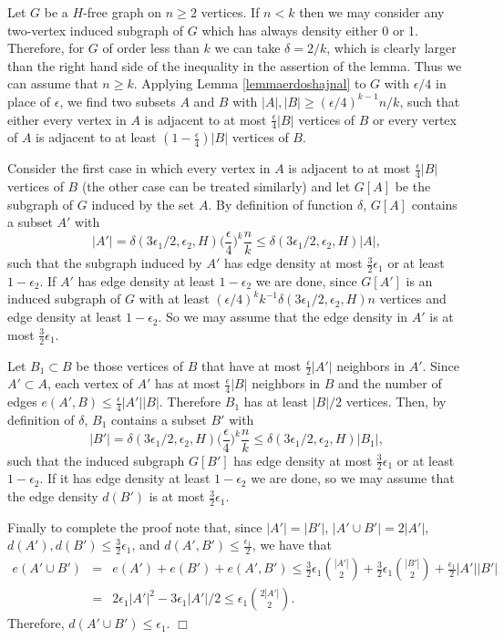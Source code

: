 \documentclass[11pt]{article}
\newenvironment{proof}
      {\medskip\noindent{\bf Proof.}\hspace{1mm}}
      {\hfill$\Box$\medskip}
\begin{document}
\begin{proof}
Let $G$ be a $H$-free graph on $n \geq 2$ vertices. If $n<k$ then we
may consider any two-vertex induced subgraph of $G$ which has always
density either 0 or 1. Therefore, for $G$ of order less than $k$ we
can take $\delta=2/k$, which is clearly larger than the right hand
side of the inequality in the assertion of the lemma. Thus we can
assume that $n \geq k$. Applying Lemma \ref{lemmaerdoshajnal} to $G$
with $\epsilon/4$ in place of $\epsilon$,  we find two subsets $A$
and $B$ with $|A|,|B| \geq (\epsilon/4)^{k-1} n/k $, such that
either every vertex in $A$ is adjacent to at most
$\frac{\epsilon}{4}|B|$ vertices of $B$ or every vertex of $A$ is
adjacent to at least $(1-\frac{\epsilon}{4})|B|$ vertices of $B$.

Consider the first case in which every vertex in $A$ is adjacent to
at most $\frac{\epsilon}{4}|B|$ vertices of $B$ (the other case can
be treated similarly) and let $G[A]$ be the subgraph of $G$ induced
by the set $A$. By definition of function $\delta$, $G[A]$ contains
a subset $A'$ with
$$|A'|= \delta(3\epsilon_1/2,\epsilon_2,H)\Big(\frac{\epsilon}{4}\Big)^{k}\frac{n}{k} \leq
 \delta(3\epsilon_1/2,\epsilon_2,H)|A|,$$
such that the subgraph induced by $A'$ has edge density at most $\frac{3}{2}\epsilon_1$ or at least
$1-\epsilon_2$. If $A'$ has edge density at least $1-\epsilon_2$ we are done, since
$G[A']$ is an induced subgraph of $G$ with at least
$(\epsilon/4)^{k}k^{-1}\delta(3\epsilon_1/2,\epsilon_2,H)n$
vertices and edge density at least $1-\epsilon_2$. So we may assume
that the edge density in $A'$ is at most $\frac{3}{2}\epsilon_1$.

Let $B_1 \subset B$ be those vertices of $B$ that have at most
$\frac{\epsilon}{2}|A'|$ neighbors in $A'$. Since $A' \subset A$, each vertex of
$A'$ has at most $\frac{\epsilon}{4}|B|$ neighbors in $B$ and the number of edges
$e(A',B) \leq \frac{\epsilon}{4}|A'||B|$. Therefore $B_1$ has at least $|B|/2$ vertices.
Then, by definition of $\delta$, $B_1$ contains a
subset $B'$ with
$$|B'| = \delta(3\epsilon_1/2,\epsilon_2,H)\Big(\frac{\epsilon}{4}\Big)^{k}\frac{n}{k}
\leq \delta(3\epsilon_1/2,\epsilon_2,H)|B_1|,$$
such that the induced subgraph $G[B']$ has edge density at most
$\frac{3}{2}\epsilon_1$ or at least $1-\epsilon_2$. If it has edge
density at least $1-\epsilon_2$ we are done, so we may assume
that the edge density $d(B')$ is at most $\frac{3}{2}\epsilon_1$.

Finally to complete the proof note that, since $|A'|=|B'|$, $|A' \cup B'|=2|A'|$,
$d(A'),d(B') \leq \frac{3}{2}\epsilon_1$, and
$d(A',B') \leq \frac{\epsilon_1}{2}$, we have that
\begin{eqnarray*}
e(A' \cup B')&=&e(A')+e(B')+e(A',B') \leq \frac{3}{2}\epsilon_1 {|A'| \choose 2}+
\frac{3}{2}\epsilon_1 {|B'| \choose 2}+
\frac{\epsilon_1}{2}|A'||B'|\\
&=&2\epsilon_1|A'|^2-3\epsilon_1 |A'|/2 \leq \epsilon_1{2|A'| \choose 2}.
\end{eqnarray*}
Therefore, $d(A' \cup B') \leq \epsilon_1$.
\end{proof}
\end{document}
